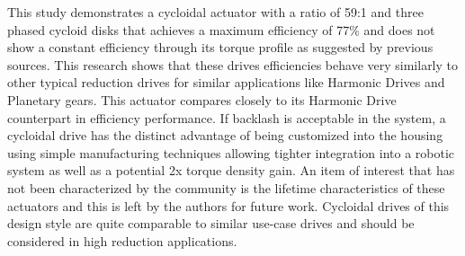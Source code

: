 This study demonstrates a cycloidal actuator with a ratio of 59:1 and three phased cycloid disks that achieves a maximum efficiency of 77\% and does not show a constant efficiency through its torque profile as suggested by previous sources.
This research shows that these drives efficiencies behave very similarly to other typical reduction drives for similar applications like Harmonic Drives and Planetary gears.
This actuator compares closely to its Harmonic Drive counterpart in efficiency performance.
If backlash is acceptable in the system, a cycloidal drive has the distinct advantage of being customized into the housing using simple manufacturing techniques allowing tighter integration into a robotic system as well as a potential 2x torque density gain.
An item of interest that has not been characterized by the community is the lifetime characteristics of these actuators and this is left by the authors for future work.
Cycloidal drives of this design style are quite comparable to similar use-case drives and should be considered in high reduction applications.
